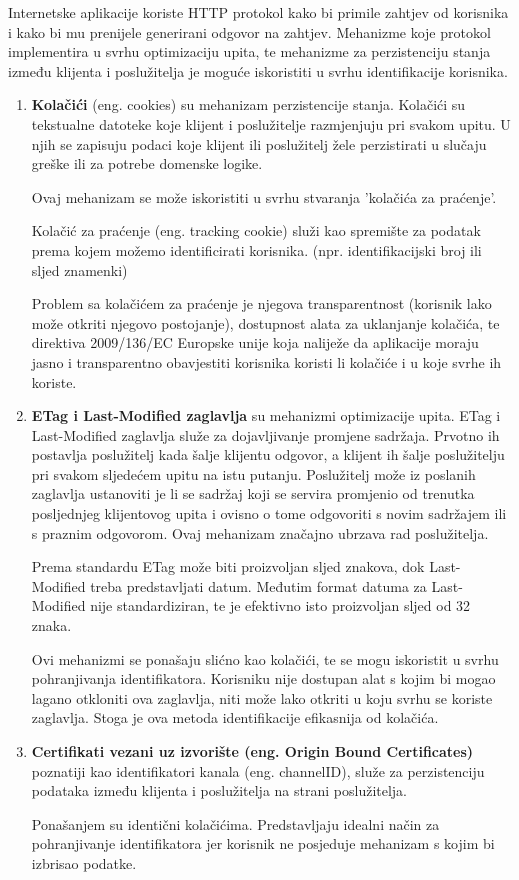 \documentclass[times, utf8, zavrsni]{fer}
\begin{document}
Internetske aplikacije koriste HTTP protokol kako bi primile zahtjev od
korisnika i kako bi mu prenijele generirani odgovor na zahtjev. Mehanizme koje
protokol implementira u svrhu optimizaciju upita, te mehanizme za perzistenciju
stanja između klijenta i poslužitelja je moguće iskoristiti u svrhu
identifikacije korisnika.

\begin{enumerate}
  \item \textbf{Kolačići} (eng. cookies) su mehanizam perzistencije stanja.
    Kolačići su tekstualne datoteke koje klijent i poslužitelje razmjenjuju pri
    svakom upitu. U njih se zapisuju podaci koje klijent ili poslužitelj
    žele perzistirati u slučaju greške ili za potrebe domenske logike.

    Ovaj mehanizam se može iskoristiti u svrhu stvaranja 'kolačića za praćenje'.

    Kolačić za praćenje (eng. tracking cookie) služi kao spremište za podatak
    prema kojem možemo identificirati korisnika. (npr. identifikacijski broj ili
    sljed znamenki)

    Problem sa kolačićem za praćenje je njegova transparentnost (korisnik
    lako može otkriti njegovo postojanje), dostupnost alata za uklanjanje
    kolačića, te direktiva 2009/136/EC Europske unije koja naliježe da
    aplikacije moraju jasno i transparentno obavjestiti korisnika koristi li
    kolačiće i u koje svrhe ih koriste.

  \item \textbf{ETag i Last-Modified zaglavlja} su mehanizmi optimizacije upita.
    ETag i Last-Modified zaglavlja služe za dojavljivanje promjene sadržaja.
    Prvotno ih postavlja poslužitelj kada šalje klijentu odgovor, a klijent ih
    šalje poslužitelju pri svakom sljedećem upitu na istu putanju. Poslužitelj
    može iz poslanih zaglavlja ustanoviti je li se sadržaj koji se servira
    promjenio od trenutka posljednjeg klijentovog upita i ovisno o tome
    odgovoriti s novim sadržajem ili s praznim odgovorom. Ovaj mehanizam
    značajno ubrzava rad poslužitelja.

    Prema standardu ETag može biti proizvoljan sljed znakova, dok Last-Modified
    treba predstavljati datum. Međutim format datuma za Last-Modified nije
    standardiziran, te je efektivno isto proizvoljan sljed od 32 znaka.

    Ovi mehanizmi se ponašaju slićno kao kolačići, te se mogu iskoristit u
    svrhu pohranjivanja identifikatora. Korisniku nije dostupan alat s kojim bi
    mogao lagano otkloniti ova zaglavlja, niti može lako otkriti u koju svrhu se
    koriste zaglavlja. Stoga je ova metoda identifikacije efikasnija od
    kolačića.

  \item \textbf{Certifikati vezani uz izvorište (eng. Origin Bound
      Certificates)} poznatiji kao identifikatori kanala (eng. channelID), služe
    za perzistenciju podataka između klijenta i poslužitelja na strani
    poslužitelja.

    Ponašanjem su identični kolačićima. Predstavljaju idealni način za
    pohranjivanje identifikatora jer korisnik ne posjeduje mehanizam s kojim bi
    izbrisao podatke.
\end{enumerate}
\end{document}

